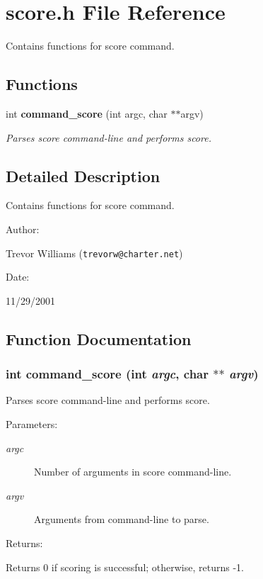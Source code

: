 \section{score.h File Reference}
\label{score_8h}
Contains functions for score command. 


\subsection*{Functions}
\begin{CompactItemize}
\item 
int {\bf command\_\-score} (int argc, char $\ast$$\ast$argv)
\begin{CompactList}\small\item\em Parses score command-line and performs score.\item\end{CompactList}\end{CompactItemize}


\subsection{Detailed Description}
Contains functions for score command.



\begin{Desc}
\item[Author: ]\par
Trevor Williams ({\tt trevorw@charter.net}) \end{Desc}
\begin{Desc}
\item[Date: ]\par
11/29/2001\end{Desc}


\subsection{Function Documentation}
\subsubsection{\setlength{\rightskip}{0pt plus 5cm}int command\_\-score (int {\em argc}, char $\ast$$\ast$ {\em argv})}\label{score_8h_a0}


Parses score command-line and performs score.

\begin{Desc}
\item[Parameters: ]\par
\begin{description}
\item[{\em 
argc}]Number of arguments in score command-line. \item[{\em 
argv}]Arguments from command-line to parse. \end{description}
\end{Desc}
\begin{Desc}
\item[Returns: ]\par
Returns 0 if scoring is successful; otherwise, returns -1. \end{Desc}

